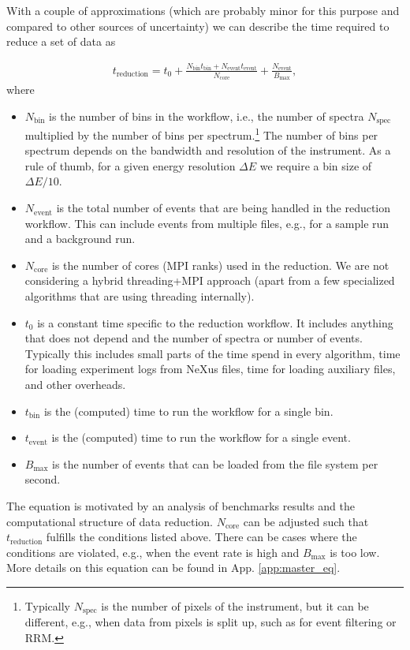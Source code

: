 \documentclass[a4paper,english,numbers=noenddot,bibliography=totoc,chapterprefix=on,DIV=12]{scrartcl}
\newcommand{\Treduction}{t_{\text{reduction}}}
\newcommand{\Tbin}{t_{\text{bin}}}
\newcommand{\Tevent}{t_{\text{event}}}
\newcommand{\Nbin}{N_{\text{bin}}}
\newcommand{\Ncore}{N_{\text{core}}}
\newcommand{\Nevent}{N_{\text{event}}}
\newcommand{\Nspec}{N_{\text{spec}}}
\newcommand{\Bmax}{B_{\text{max}}}
\begin{document}
With a couple of approximations (which are probably minor for this purpose and compared to other sources of uncertainty) we can describe the time required to reduce a set of data as

\begin{align}
  \Treduction = t_0 + \frac{\Nbin\Tbin + \Nevent\Tevent}{\Ncore} + \frac{\Nevent}{\Bmax},
  \label{eq:master}
\end{align}
where
\begin{itemize}
  \item $\Nbin$ is the number of bins in the workflow, i.e., the number of spectra $\Nspec$ multiplied by the number of bins per spectrum.\footnote{Typically $\Nspec$ is the number of pixels of the instrument, but it can be different, e.g., when data from pixels is split up, such as for event filtering or RRM.}
    The number of bins per spectrum depends on the bandwidth and resolution of the instrument.
    As a rule of thumb, for a given energy resolution $\Delta E$ we require a bin size of $\Delta E/10$.
  \item $\Nevent$ is the total number of events that are being handled in the reduction workflow.
    This can include events from multiple files, e.g., for a sample run and a background run.
  \item $\Ncore$ is the number of cores (MPI ranks) used in the reduction.
    We are not considering a hybrid threading+MPI approach (apart from a few specialized algorithms that are using threading internally).
  \item $t_0$ is a constant time specific to the reduction workflow.
    It includes anything that does not depend and the number of spectra or number of events.
    Typically this includes small parts of the time spend in every algorithm, time for loading experiment logs from NeXus files, time for loading auxiliary files, and other overheads.
  \item $\Tbin$ is the (computed) time to run the workflow for a single bin.
  \item $\Tevent$ is the (computed) time to run the workflow for a single event.
  \item $\Bmax$ is the number of events that can be loaded from the file system per second.
\end{itemize}
The equation is motivated by an analysis of benchmarks results and the computational structure of data reduction.
$\Ncore$ can be adjusted such that $\Treduction$ fulfills the conditions listed above.
There can be cases where the conditions are violated, e.g., when the event rate is high and $\Bmax$ is too low.
More details on this equation can be found in App. \ref{app:master_eq}.
\end{document}
